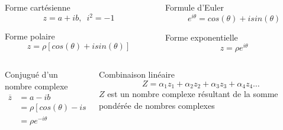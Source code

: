 \documentclass{beamer}
\begin{document}
\begin{frame}
\begin{columns}[t]
	\begin{column}{5.5cm}
		\begin{block}{Forme cartésienne}
			\[
			z = a + ib,\enspace i^{2}=-1
			\]
		\end{block}
		\pause
		\begin{block}{Forme polaire}
		\[
			z = \rho [cos(\theta) + isin(\theta)]
			\]
		\end{block}	
		\pause
	\end{column}
	\begin{column}{5.5cm}
		\begin{block}{Formule d'Euler}
			\[
			e^{i\theta} = cos(\theta) + isin(\theta)
			\]
		\end{block}
		\pause
		\begin{block}{Forme exponentielle}
			\[
			z = \rho e^{i\theta}
			\]
		\end{block}
	\end{column}
\end{columns}
\pause
\begin{columns}[t]
	\begin{column}{5.5cm}
		\begin{block}{Conjugué d'un nombre complexe}
			\begin{align*}
				\overline{z} &= a-ib\\
							&=\rho[cos(\theta) - isin(\theta)]\\
							&=\rho e^{-i\theta}
			\end{align*}
		\end{block}
	\end{column}
	\begin{column}{5.5cm} 
		\pause
		\begin{block}{Combinaison linéaire}
			\[
			Z =\alpha_1 z_1 + \alpha_2 z_2 + \alpha_3 z_3 + \alpha_4 z_4 \ldots
			\]
			\justifying
			$Z$ est un nombre complexe résultant de la somme pondérée de nombres complexes
		\end{block}
	\end{column}
\end{columns}
\end{frame}
\end{document}
